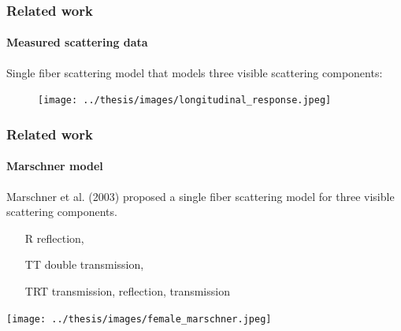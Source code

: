 \documentclass{beamer}
\begin{document}
  
  \begin{frame}
    \frametitle{Related work}
    \framesubtitle{Measured scattering data}
    Single fiber scattering model that models three visible scattering components:
    
    \begin{figure}
    \centering
    \texttt{[image: ../thesis/images/longitudinal\_response.jpeg]}
    \end{figure}
  \end{frame}
  
    \begin{frame}
    \frametitle{Related work}
    \framesubtitle{Marschner model}
    Marschner et al. (2003) proposed a single fiber scattering model for three visible scattering components.
    \begin{itemize}
    \centering
    \item[R] reflection,
    \item[TT] double transmission,
    \item[TRT] transmission, reflection, transmission
    \end{itemize}
    
    \texttt{[image: ../thesis/images/female\_marschner.jpeg]}
    
  \end{frame}
  
\end{document}

